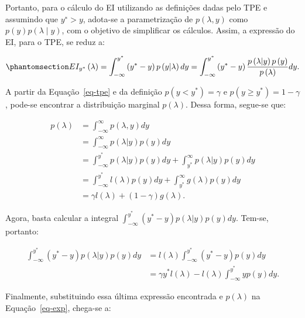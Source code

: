 \documentclass[
  12pt,
  a4paper,
]{scrreprt}
\begin{document}
\vspace{12pt}

Portanto, para o cálculo do EI utilizando as definições dadas pelo TPE e
assumindo que \(y^∗>y\), adota-se a parametrização de
\(p\left(\lambda,y\right)\) como
\(p\left(y\right)p\left(\lambda∣y\right)\), com o objetivo de
simplificar os cálculos. Assim, a expressão do EI, para o TPE, se reduz
a:

\begin{equation}\phantomsection\label{eq-exp}{
EI_{y^*}\left(\lambda\right) = \int_{-\infty}^{y^*} \left(y^* - y\right)p\left(y | \lambda\right) dy = \int_{-\infty}^{y^*} \left(y^* - y\right)\frac{p\left(\lambda | y\right) p\left(y \right)}{p\left(\lambda\right)} dy\text{.}
}\end{equation}

A partir da Equação~\ref{eq-tpe} e da definição
\(p\left(y < y^*\right) = \gamma\) e
\(p\left(y \geq y^*\right) = 1 - \gamma\), pode-se encontrar a
distribuição marginal \(p\left(\lambda\right)\). Dessa forma, segue-se
que:

\[
\begin{aligned}
p\left(\lambda\right) &= \int_{-\infty}^{\infty} p\left(\lambda, y\right) dy \\
&= \int_{-\infty}^{\infty} p\left(\lambda | y\right) p\left(y\right) dy \\
&= \int_{-\infty}^{y^*} p\left(\lambda | y\right) p\left(y\right) dy + \int_{y^*}^{\infty} p\left(\lambda | y\right) p\left(y\right) dy \\
&= \int_{-\infty}^{y^*} l\left(\lambda\right) p\left(y\right) dy + \int_{y^*}^{\infty} g\left(\lambda\right) p\left(y\right) dy \\
&= \gamma l\left(\lambda\right) + \left(1 - \gamma\right) g\left(\lambda\right)\text{.}
\end{aligned}
\]

Agora, basta calcular a integral
\(\int_{-\infty}^{y^*}\left(y^* - y\right) p\left(\lambda|y\right)p\left(y\right)dy\).
Tem-se, portanto:

\[
\begin{aligned}
\int_{-\infty}^{y^*}\left(y^* - y\right) p\left(\lambda|y\right)p\left(y\right)dy &= l\left(\lambda\right) \int_{-\infty}^{y^*} \left(y^* - y\right) p\left(y\right)dy \\
&= \gamma y^{*} l\left(\lambda\right) - l\left(\lambda\right) \int_{-\infty}^{y^*} y p\left(y\right)dy\text{.}
\end{aligned}
\]

Finalmente, substituindo essa última expressão encontrada e
\(p\left(\lambda\right)\) na Equação~\ref{eq-exp}, chega-se a:
\end{document}
